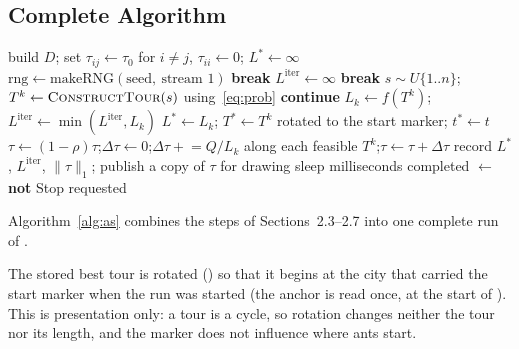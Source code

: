 \documentclass[11pt,a4paper]{article}
\begin{document}
\subsection{Complete Algorithm}

\begin{algorithm}[tbp]
\caption{Ant System as implemented in \texttt{Model::runACO()}}\label{alg:as}
\begin{algorithmic}[1]
\State build $D$; set $\tau_{ij}\gets\tau_0$ for $i\ne j$, $\tau_{ii}\gets0$; $L^\ast\gets\infty$
\State $\text{rng}\gets\text{makeRNG}(\text{seed},\ \text{stream }1)$
   \textbf{break} \EndIf
  \State $L^{\text{iter}}\gets\infty$
     \textbf{break} \EndIf
    \State $s\sim U\{1..n\}$;\quad $T^k\gets\textsc{ConstructTour}(s)$ using~\eqref{eq:prob}
     \textbf{continue} \EndIf
    \State $L_k\gets f(T^k)$;\quad $L^{\text{iter}}\gets\min(L^{\text{iter}},L_k)$
     \State $L^\ast\gets L_k$; $T^\ast\gets T^k$ rotated to the start marker; $t^\ast\gets t$ \EndIf
  \EndFor
  \State $\tau\gets(1-\rho)\tau$;\quad $\Delta\tau\gets0$;\quad $\Delta\tau\mathrel{+}=Q/L_k$ along each feasible $T^k$;\quad $\tau\gets\tau+\Delta\tau$
  \State record $L^\ast$, $L^{\text{iter}}$, $\lVert\tau\rVert_1$; publish a copy of $\tau$ for drawing 
  \State sleep  milliseconds 
\EndFor
\State completed $\gets$ \textbf{not} Stop requested
\end{algorithmic}
\end{algorithm}

Algorithm~\ref{alg:as} combines the steps of Sections~2.3--2.7 into one complete run of .

The stored best tour is rotated () so that it begins at the city that carried the
start marker when the run was started (the anchor is read once, at the start of ). This is presentation only: a tour is a cycle, so rotation changes neither the tour nor its
length, and the marker does not influence where ants start.
\end{document}
